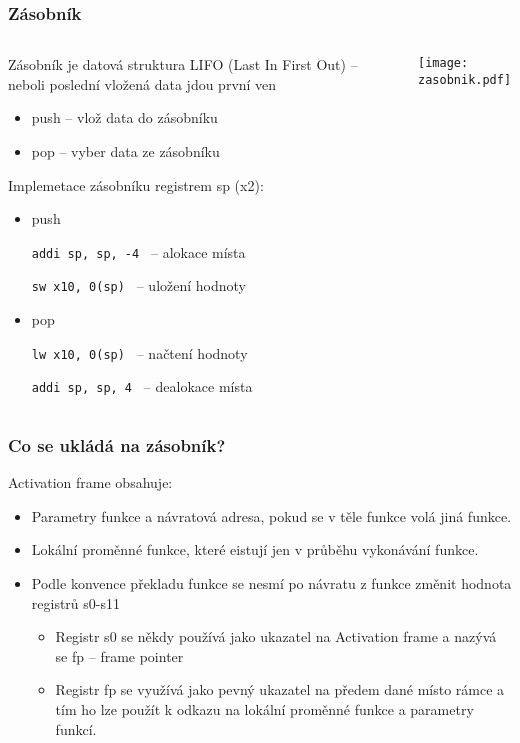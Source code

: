 \documentclass{beamer}
\begin{document}
\begin{frame}
\frametitle{Zásobník}

\begin{columns}
\begin{column}{0.7\textwidth}
Zásobník je datová struktura LIFO (Last In First Out) -- neboli poslední vložená data jdou první ven
\begin{itemize}
 \item push -- vlož data do zásobníku
 \item pop -- vyber data ze zásobníku
\end{itemize}

Implemetace zásobníku registrem sp (x2):
\begin{itemize}
 \item push 
 
\texttt{addi sp, sp, -4 \phantom{xx}}  -- alokace místa

\texttt{sw \phantom{xx}x10, 0(sp) \phantom{xx}}  -- uložení hodnoty
 
 \item pop

\texttt{lw \phantom{xx}x10, 0(sp) \phantom{xx}}  -- načtení hodnoty

\texttt{addi sp, sp, 4 \phantom{xxx}}  -- dealokace místa

\end{itemize}

\end{column}
\hfill
\begin{column}{0.3\textwidth}  
\texttt{[image: zasobnik.pdf]}
\end{column}
\end{columns}

\end{frame}

\begin{frame}
\frametitle{Co se ukládá na zásobník?}

Activation frame obsahuje:
\begin{itemize}
 \item Parametry funkce a návratová adresa, pokud se v těle funkce volá jiná funkce.
 \item Lokální proměnné funkce, které eistují jen v průběhu vykonávání funkce.
 \item Podle konvence překladu funkce se nesmí po návratu z funkce změnit hodnota registrů s0-s11
\begin{itemize}
 \item Registr s0 se někdy používá jako ukazatel na Activation frame a nazývá se fp -- frame pointer
 \item Registr fp se využívá jako pevný ukazatel na předem dané místo rámce a tím ho lze použít k odkazu na lokální proměnné funkce a parametry funkcí.
\end{itemize}
\end{itemize}
\end{frame}
\end{document}

